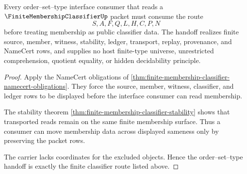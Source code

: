 \begin{theorem}
\label{thm:finite-membership-classifier-interface-handoff}
Every order--set--type interface consumer that reads a $\FiniteMembershipClassifierUp$ packet must consume the route
$$
S,A,F,Q,L,H,C,P,N
$$
before treating membership as public classifier data. The handoff realizes finite source, member, witness, stability, ledger, transport, replay, provenance, and NameCert rows, and supplies no host finite-type universe, unrestricted comprehension, quotient equality, or hidden decidability principle.
\end{theorem}
\begin{proof}
Apply the NameCert obligations of \autoref{thm:finite-membership-classifier-namecert-obligations}. They force the source, member, witness, classifier, and ledger rows to be displayed before the interface consumer can read membership.

The stability theorem \autoref{thm:finite-membership-classifier-stability} shows that transported reads remain on the same finite membership surface. Thus a consumer can move membership data across displayed sameness only by preserving the packet rows.

The carrier lacks coordinates for the excluded objects. Hence the order--set--type handoff is exactly the finite classifier route listed above.
\end{proof}




